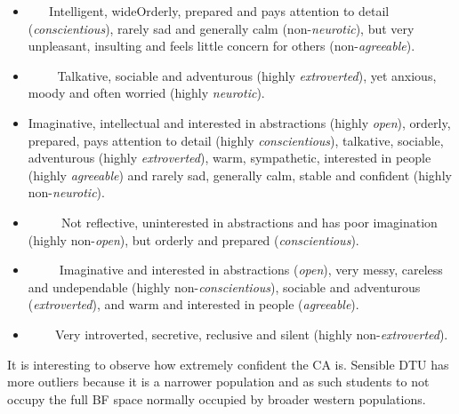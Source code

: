 \begin{itemize}[label={},leftmargin=0cm]
\item $\,\,\,\,\,\,\,\,$\textbf{\achiever} \qquad Intelligent, wideOrderly, prepared and pays attention to detail (\textit{conscientious}), rarely sad and generally calm (non-\textit{neurotic}), but very unpleasant, insulting and feels little concern for others (non-\textit{agreeable}).
\item $\,\,\,\,\,\,\,\,\,\,\,\,$\textbf{\host} \qquad Talkative, sociable and adventurous (highly \textit{extroverted}), yet anxious, moody and often worried (highly \textit{neurotic}).
\item \textbf{\wildcard} \qquad Imaginative, intellectual and interested in abstractions (highly \textit{open}), orderly, prepared, pays attention to detail (highly \textit{conscientious}), talkative, sociable, adventurous (highly \textit{extroverted}), warm, sympathetic, interested in people (highly \textit{agreeable}) and rarely sad, generally calm, stable and confident (highly non-\textit{neurotic}).
\item $\,\,\,\,\,\,\,\,\,\,\,\,\,\,$\textbf{\loyalist} \qquad Not reflective, uninterested in abstractions and has poor imagination (highly non-\textit{open}), but orderly and prepared (\textit{conscientious}).
\item $\,\,\,\,\,\,\,\,\,\,\,\,\,$\textbf{\hippie} \qquad Imaginative and interested in abstractions (\textit{open}), very messy, careless and undependable (highly non-\textit{conscientious}), sociable and adventurous (\textit{extroverted}), and warm and interested in people (\textit{agreeable}).
\item $\,\,\,\,\,\,\,\,\,\,\,$\textbf{\follower} \qquad Very introverted, secretive, reclusive and silent (highly non-\textit{extroverted}).
\end{itemize}

It is interesting to observe how extremely confident the \wildcard CA is. 
Sensible DTU has more outliers because it is a narrower population and as such students to not occupy the full BF space normally occupied by broader western populations.
